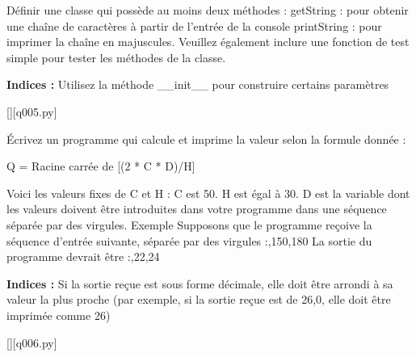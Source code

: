 \question
Définir une classe qui possède au moins deux méthodes :\newline
getString : pour obtenir une chaîne de caractères à partir de l'entrée de la console\newline
printString : pour imprimer la chaîne en majuscules.\newline
Veuillez également inclure une fonction de test simple pour tester les méthodes de la classe.
\par
\textbf{Indices : }Utilisez la méthode \_\_init\_\_ pour construire certains paramètres
\renewcommand{\nomfichier}{q005.py}
\begin{solution}
    \pythonfile{\chemincode \nomfichier}[][\nomfichier]
\end{solution}

\question
Écrivez un programme qui calcule et imprime la valeur selon la formule donnée :

Q = Racine carrée de [(2 * C * D)/H]\newline

Voici les valeurs fixes de C et H :\newline
C est 50. H est égal à 30.\newline
D est la variable dont les valeurs doivent être introduites dans votre programme dans une séquence séparée par des virgules.\newline
Exemple\newline
Supposons que le programme reçoive la séquence d'entrée suivante, séparée par des virgules :,150,180\newline
La sortie du programme devrait être :,22,24
\par
\textbf{Indices : }Si la sortie reçue est sous forme décimale, elle doit être arrondi à sa valeur la plus proche (par exemple, si la sortie reçue est de 26,0, elle doit être imprimée comme 26)
\renewcommand{\nomfichier}{q006.py}
\begin{solution}
    \pythonfile{\chemincode \nomfichier}[][\nomfichier]
\end{solution}

